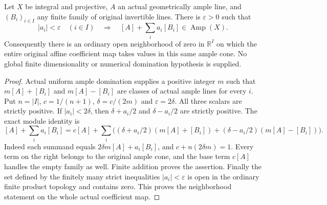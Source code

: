 \begin{theorem}
\label{thm:native-numerical-finite-ample-openness}
\leanok
{}
Let $X$ be integral and projective, $A$ an actual geometrically ample
line, and $(B_i)_{i\in I}$ any finite family of original invertible
lines. There is $\varepsilon>0$ such that
\[
 |a_i|<\varepsilon\quad(i\in I)
 \quad\Longrightarrow\quad
 [A]+\sum_i a_i[B_i]\in\operatorname{Amp}(X).
\]
Consequently there is an ordinary open neighborhood of zero in
$\mathbb R^I$ on which the entire original affine coefficient map takes
values in this same ample cone. No global finite dimensionality or
numerical domination hypothesis is supplied.
\end{theorem}
\begin{proof}
Actual uniform ample domination supplies a positive integer $m$ such
that $m[A]+[B_i]$ and $m[A]-[B_i]$ are classes of actual ample lines for
every $i$. Put $n=|I|$, $c=1/(n+1)$,
$\delta=c/(2m)$ and $\varepsilon=2\delta$. All three scalars are
strictly positive. If $|a_i|<2\delta$, then
$\delta+a_i/2$ and $\delta-a_i/2$ are strictly positive. The exact module
identity is
\[
 [A]+\sum_i a_i[B_i]
 = c[A]+\sum_i\bigl((\delta+a_i/2)(m[A]+[B_i])
                +(\delta-a_i/2)(m[A]-[B_i])\bigr).
\]
Indeed each summand equals $2\delta m[A]+a_i[B_i]$, and
$c+n(2\delta m)=1$. Every term on the right belongs to the original
ample cone, and the base term $c[A]$ handles the empty family as well.
Finite addition proves the assertion. Finally the set defined by the
finitely many strict inequalities $|a_i|<\varepsilon$ is open in the
ordinary finite product topology and contains zero. This proves the
neighborhood statement on the whole actual coefficient map.
\end{proof}
